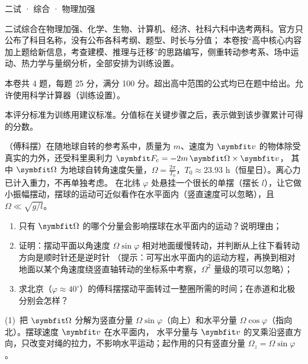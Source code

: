 \documentclass[cjk=noto, seal=first]{mojing-exam}
\begin{document}
\begin{paper}[time={建议 1.5 小时（训练设置）}, full=100]{二试 · 综合 · 物理加强}

\begin{instructions}
  \item 二试综合在物理加强、化学、生物、计算机、经济、社科六科中选考两科。官方只公布了科目名称，没有公布各科考纲、题型、时长与分值；
        本卷按“高中核心内容加上题给新信息，考查建模、推理与迁移”的思路编写，侧重转动参考系、场中运动、热力学与量纲分析，全部安排为训练设置。
  \item 本卷共 4 题，每题 25 分，满分 100 分。超出高中范围的公式均已在题中给出。允许使用科学计算器（训练设置）。
\end{instructions}

\begin{gradingnotes}
  \item 本评分标准为训练用建议标准。分值标在关键步骤之后，表示做到该步骤累计可得的分数。
\end{gradingnotes}


\begin{questions}

\question[25]
（傅科摆）在随地球自转的参考系中，质量为 $m$、速度为 $\vb v$ 的物体除受真实的力外，还受科里奥利力 $\vb F_{\rm c}=-2m\,\vb\Omega\times\vb v$，
其中 $\vb\Omega$ 为地球自转角速度矢量，$\Omega=\frac{2\pi}{T_0}$，$T_0\approx23.93$ h（恒星日）。离心力已计入重力，不再单独考虑。
在北纬 $\varphi$ 处悬挂一个很长的单摆（摆长 $l$），让它做小振幅摆动，摆球的运动可近似看作在水平面内（竖直速度可以忽略），且 $\Omega\ll\sqrt{g/l}$。
\begin{enumerate}
  \item 只有 $\vb\Omega$ 的哪个分量会影响摆球在水平面内的运动？说明理由；
  \item 证明：摆动平面以角速度 $\Omega\sin\varphi$ 相对地面缓慢转动，并判断从上往下看转动方向是顺时针还是逆时针
        （提示：可写出水平面内的运动方程，再换到相对地面以某个角速度绕竖直轴转动的坐标系中考察，$\Omega^2$ 量级的项可以忽略）；
  \item 求北京（$\varphi\approx40^\circ$）的傅科摆摆动平面转过一整圈所需的时间；在赤道和北极分别会怎样？
\end{enumerate}
\answerspace{2cm}
\begin{solution}
(1)~把 $\vb\Omega$ 分解为竖直分量 $\Omega\sin\varphi$（向上）和水平分量 $\Omega\cos\varphi$（指向北）。摆球速度 $\vb v$ 在水平面内，
水平分量与 $\vb v$ 的叉乘沿竖直方向，只改变对绳的拉力，不影响水平运动；起作用的只有竖直分量 $\Omega_z=\Omega\sin\varphi$。


\end{solution}
\end{questions}
\end{paper}
\end{document}
